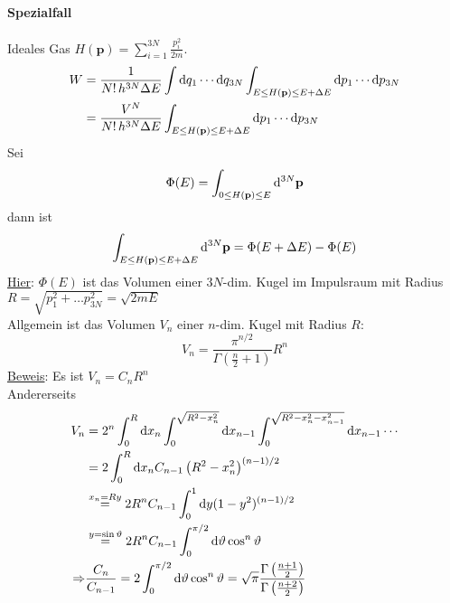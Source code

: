 \paragraph{Spezialfall} Ideales Gas $H(\textbf{p}) = \sum_{i=1}^{3N} \frac{p_i^2}{2 m}$.
\begin{equation}
    \begin{split}
        W &= \frac{1}{N! \, h^{3N} \Delta E} \int \mathrm{d} q_1 \cdots \mathrm{d} q_{3N}  \int_{E\leq H(\textbf{p})\leq E+\Delta E} \mathrm{d} p_1 \cdots \mathrm{d} p_{3N}  \\
        &= \frac{V^N}{N! \, h^{3N} \Delta E} \int_{E\leq H(\textbf{p})\leq E+\Delta E} \mathrm{d} p_1 \cdots \mathrm{d} p_{3N}
    \end{split}
\end{equation}
Sei
\begin{equation}
    \Phi(E) = \int_{0\leq H(\textbf{p})\leq E} \mathrm{d}^{3N} \textbf{p}
\end{equation}
dann ist
\begin{equation}
    \int_{E\leq H(\textbf{p})\leq E+\Delta E} \mathrm{d}^{3N} \textbf{p} = \Phi(E+\Delta E) - \Phi(E)
\end{equation}
\underline{Hier}: $\Phi(E)$ ist das Volumen einer $3N$-dim. Kugel im Impulsraum mit Radius $R = \sqrt{p_1^2 + \ldots p_{3N}^2} = \sqrt{2 m E}$ \\
Allgemein ist das Volumen $V_n$ einer $n$-dim. Kugel mit Radius $R$:
\begin{equation}
    V_n = \frac{\pi^{n/2}}{\Gamma \left( \frac{n}{2} + 1 \right)} R^n
\end{equation}
\underline{Beweis}: Es ist $V_n = C_n R^n$ \\
Andererseits
\begin{equation}
    \begin{split}
        V_n &= 2^n \int_{0}^{R} \mathrm{d} x_n \int_{0}^{\sqrt{R^2 - x_n^2}} \mathrm{d} x_{n-1} \int_{0}^{\sqrt{R^2 - x_n^2 - x_{n-1}^2}} \mathrm{d} x_{n-1} \cdots \\
        & = 2 \int_{0}^{R} \mathrm{d} x_n C_{n-1} \left( R^2 - x_n^2 \right)^{(n-1)/2} \\
        & \overset{x_n = R y}{=} 2 R^n C_{n-1} \int_{0}^{1} \mathrm{d} y (1-y^2)^{(n-1)/2} \\
        & \overset{y = \sin \vartheta}{=} 2 R^n C_{n-1} \int_0^{\pi/2} \mathrm{d} \vartheta \cos^n \vartheta \\
        \Rightarrow & \frac{C_n}{C_{n-1}} = 2 \int_0^{\pi/2} \mathrm{d} \vartheta \cos^n \vartheta = \sqrt{\pi} \frac{\Gamma \left( \frac{n+1}{2} \right)}{\Gamma \left( \frac{n+2}{2} \right) }
    \end{split}
\end{equation}
